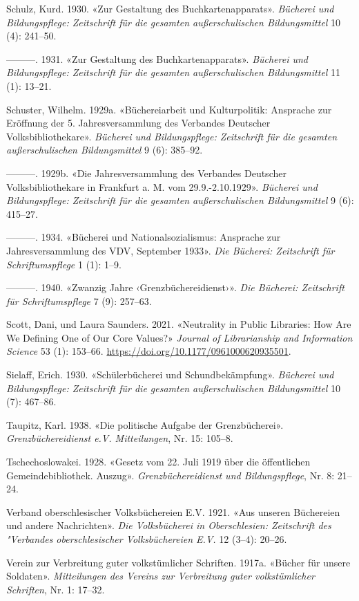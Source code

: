 \documentclass[a4paper,
fontsize=11pt,
oneside,
numbers=noperiodatend,
parskip=half-,
bibliography=totoc,
final
]{scrartcl}
\begin{document}
Schulz, Kurd. 1930. «Zur Gestaltung des Buchkartenapparats».
\emph{Bücherei und Bildungspflege: Zeitschrift für die gesamten
außerschulischen Bildungsmittel} 10 (4): 241--50.

---------. 1931. «Zur Gestaltung des Buchkartenapparats». \emph{Bücherei
und Bildungspflege: Zeitschrift für die gesamten außerschulischen
Bildungsmittel} 11 (1): 13--21.

Schuster, Wilhelm. 1929a. «Büchereiarbeit und Kulturpolitik: Ansprache
zur Eröffnung der 5. Jahresversammlung des Verbandes Deutscher
Volksbibliothekare». \emph{Bücherei und Bildungspflege: Zeitschrift für
die gesamten außerschulischen Bildungsmittel} 9 (6): 385--92.

---------. 1929b. «Die Jahresversammlung des Verbandes Deutscher
Volksbibliothekare in Frankfurt a. M. vom 29.9.-2.10.1929».
\emph{Bücherei und Bildungspflege: Zeitschrift für die gesamten
außerschulischen Bildungsmittel} 9 (6): 415--27.

---------. 1934. «Bücherei und Nationalsozialismus: Ansprache zur
Jahresversammlung des VDV, September 1933». \emph{Die Bücherei:
Zeitschrift für Schriftumspflege} 1 (1): 1--9.

---------. 1940. «Zwanzig Jahre ‹Grenzbüchereidienst›». \emph{Die
Bücherei: Zeitschrift für Schriftumspflege} 7 (9): 257--63.

Scott, Dani, und Laura Saunders. 2021. «Neutrality in Public Libraries:
How Are We Defining One of Our Core Values?» \emph{Journal of
Librarianship and Information Science} 53 (1): 153--66.
\url{https://doi.org/10.1177/0961000620935501}.

Sielaff, Erich. 1930. «Schülerbücherei und Schundbekämpfung».
\emph{Bücherei und Bildungspflege: Zeitschrift für die gesamten
außerschulischen Bildungsmittel} 10 (7): 467--86.

Taupitz, Karl. 1938. «Die politische Aufgabe der Grenzbücherei».
\emph{Grenzbüchereidienst e.V. Mitteilungen}, Nr. 15: 105--8.

Tschechoslowakei. 1928. «Gesetz vom 22. Juli 1919 über die öffentlichen
Gemeindebibliothek. Auszug». \emph{Grenzbüchereidienst und
Bildungspflege}, Nr. 8: 21--24.

Verband oberschlesischer Volksbüchereien E.V. 1921. «Aus unseren
Büchereien und andere Nachrichten». \emph{Die Volksbücherei in
Oberschlesien: Zeitschrift des "Verbandes oberschlesischer
Volksbüchereien E.V.} 12 (3--4): 20--26.

Verein zur Verbreitung guter volkstümlicher Schriften. 1917a. «Bücher
für unsere Soldaten». \emph{Mitteilungen des Vereins zur Verbreitung
guter volkstümlicher Schriften}, Nr. 1: 17--32.
\end{document}
